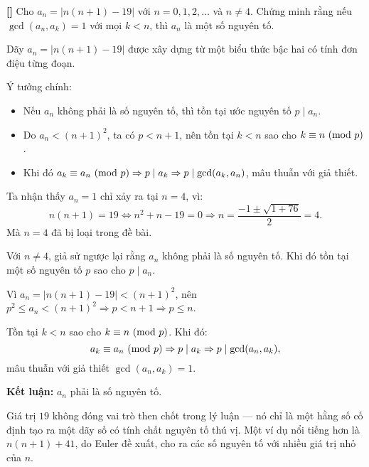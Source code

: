 \documentclass[../05-modular-arithmetic-a.tex]{subfiles}
\begin{document}
\begin{example*}\label{example:POL-2015-MO-P3}\textbf{[]}
    Cho \( a_n = |n(n+1) - 19| \) với \( n = 0, 1, 2, \ldots \) và \( n \ne 4 \).
    Chứng minh rằng nếu \( \gcd(a_n, a_k) = 1 \) với mọi \( k < n \), thì \( a_n \) là một số nguyên tố.
\end{example*}

\begin{story*}
	Dãy \( a_n = |n(n+1) - 19| \) được xây dựng từ một biểu thức bậc hai có tính đơn điệu từng đoạn.

	Ý tưởng chính:
	\begin{itemize}[topsep=0pt, partopsep=0pt, itemsep=0pt]
		\item Nếu \( a_n \) không phải là số nguyên tố, thì tồn tại ước nguyên tố \( p \mid a_n \).
		\item Do \( a_n < (n+1)^2 \), ta có \( p < n+1 \), nên tồn tại \( k < n \) sao cho \( k \equiv n \ (\mathrm{mod}\ p) \).
		\item Khi đó \( a_k \equiv a_n \ (\mathrm{mod}\ p) \Rightarrow p \mid a_k \Rightarrow p \mid \gcd(a_k, a_n) \), mâu thuẫn với giả thiết.
	\end{itemize}
\end{story*}

\bigbreak

\begin{soln}\footnotemark
	Ta nhận thấy \( a_n = 1 \) chỉ xảy ra tại \( n = 4 \), vì:
	\[
	n(n+1) = 19 \iff n^2 + n - 19 = 0 \Rightarrow n = \frac{-1 \pm \sqrt{1 + 76}}{2} = 4.
	\]
	Mà \( n = 4 \) đã bị loại trong đề bài.

	Với \( n \ne 4 \), giả sử ngược lại rằng \( a_n \) không phải là số nguyên tố.
	Khi đó tồn tại một số nguyên tố \( p \) sao cho \( p \mid a_n \).

	Vì \( a_n = |n(n+1) - 19| < (n+1)^2 \), nên \( p^2 \le a_n < (n+1)^2 \Rightarrow p < n+1 \Rightarrow p \le n \).

	Tồn tại \( k < n \) sao cho \( k \equiv n \ (\mathrm{mod}\ p) \). Khi đó:
	\[
	a_k \equiv a_n \ (\mathrm{mod}\ p) \Rightarrow p \mid a_k \Rightarrow p \mid \gcd(a_n, a_k),
	\]
	mâu thuẫn với giả thiết \( \gcd(a_n, a_k) = 1 \).

	\textbf{Kết luận:} \( a_n \) phải là số nguyên tố.
\end{soln}

\begin{remark*}
	Giá trị \( 19 \) không đóng vai trò then chốt trong lý luận — nó chỉ là một hằng số cố định tạo ra một dãy số có tính chất nguyên tố thú vị.
	Một ví dụ nổi tiếng hơn là \( n(n+1) + 41 \), do Euler đề xuất, cho ra các số nguyên tố với nhiều giá trị nhỏ của \( n \).
\end{remark*}

\end{document}
